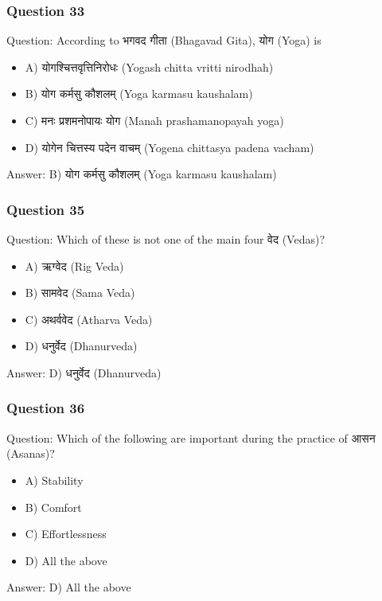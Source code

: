 \begin{frame}[fragile]\frametitle{Question 33}
Question: According to भगवद गीता (Bhagavad Gita), योग (Yoga) is
\begin{itemize}
\item A) योगश्चित्तवृत्तिनिरोधः (Yogash chitta vritti nirodhah)
\item B) योग कर्मसु कौशलम् (Yoga karmasu kaushalam)
\item C) मनः प्रशमनोपायः योग (Manah prashamanopayah yoga)
\item D) योगेन चित्तस्य पदेन वाचम् (Yogena chittasya padena vacham)
\end{itemize}
Answer: B) योग कर्मसु कौशलम् (Yoga karmasu kaushalam)
\end{frame}


\begin{frame}[fragile]\frametitle{Question 35}
Question: Which of these is not one of the main four वेद (Vedas)?
\begin{itemize}
\item A) ऋग्वेद (Rig Veda)
\item B) सामवेद (Sama Veda)
\item C) अथर्ववेद (Atharva Veda)
\item D) धनुर्वेद (Dhanurveda)
\end{itemize}
Answer: D) धनुर्वेद (Dhanurveda)
\end{frame}

\begin{frame}[fragile]\frametitle{Question 36}
Question: Which of the following are important during the practice of आसन (Asanas)?
\begin{itemize}
\item A) Stability
\item B) Comfort
\item C) Effortlessness
\item D) All the above
\end{itemize}
Answer: D) All the above
\end{frame}

